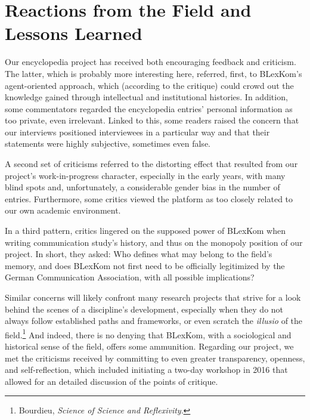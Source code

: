\documentclass{tufte-handout}
\begin{document}
\hypertarget{reactions-from-the-field-and-lessons-learned}{%
\section{Reactions from the Field and Lessons
Learned}\label{reactions-from-the-field-and-lessons-learned}}

Our encyclopedia project has received both encouraging feedback and
criticism. The latter, which is probably more interesting here,
referred, first, to BLexKom's agent-oriented approach, which (according
to the critique) could crowd out the knowledge gained through
intellectual and institutional histories. In addition, some commentators
regarded the encyclopedia entries' personal information as too private,
even irrelevant. Linked to this, some readers raised the concern that
our interviews positioned interviewees in a particular way and that
their statements were highly subjective, sometimes even false.

A second set of criticisms referred to the distorting effect that
resulted from our project's work-in-progress character, especially in
the early years, with many blind spots and, unfortunately, a
considerable gender bias in the number of entries. Furthermore, some
critics viewed the platform as too closely related to our own academic
environment.

In a third pattern, critics lingered on the supposed power of BLexKom
when writing communication study's history, and thus on the monopoly
position of our project. In short, they asked: Who defines what may
belong to the field's memory, and does BLexKom not first need to be
officially legitimized by the German Communication Association, with all
possible implications?

Similar concerns will likely confront many research projects that strive
for a look behind the scenes of a discipline's development, especially
when they do not always follow established paths and frameworks, or even
scratch the \emph{illusio} of the
field.\footnote{ Bourdieu, \emph{Science of Science and Reflexivity}.} And indeed, there is no
denying that BLexKom, with a sociological and historical sense of the
field, offers some ammunition. Regarding our project, we met the
criticisms received by committing to even greater transparency,
openness, and self-reflection, which included initiating a two-day
workshop in 2016 that allowed for an detailed discussion of the points
of critique.
\end{document}
